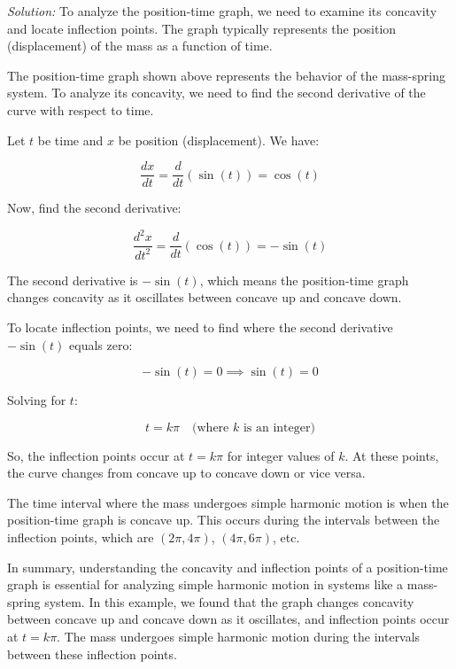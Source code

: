 \documentclass[a4paper,12pt]{book}
\newenvironment{solution}[1][]
{\par\noindent\textit{Solution:} \rmfamily}{\medskip}
\newcounter{example}
\begin{document}
\begin{solution}
To analyze the position-time graph, we need to examine its concavity and locate inflection points. The graph typically represents the position (displacement) of the mass as a function of time.

\begin{center}
\end{center}

The position-time graph shown above represents the behavior of the mass-spring system. To analyze its concavity, we need to find the second derivative of the curve with respect to time.

Let \(t\) be time and \(x\) be position (displacement). We have:

\[
\frac{dx}{dt} = \frac{d}{dt}(\sin(t)) = \cos(t)
\]

Now, find the second derivative:

\[
\frac{d^2x}{dt^2} = \frac{d}{dt}(\cos(t)) = -\sin(t)
\]

The second derivative is \(-\sin(t)\), which means the position-time graph changes concavity as it oscillates between concave up and concave down.

To locate inflection points, we need to find where the second derivative \(-\sin(t)\) equals zero:

\[
-\sin(t) = 0 \implies \sin(t) = 0
\]

Solving for \(t\):

\[
t = k\pi \quad \text{(where \(k\) is an integer)}
\]

So, the inflection points occur at \(t = k\pi\) for integer values of \(k\). At these points, the curve changes from concave up to concave down or vice versa.

The time interval where the mass undergoes simple harmonic motion is when the position-time graph is concave up. This occurs during the intervals between the inflection points, which are \((2\pi, 4\pi)\), \((4\pi, 6\pi)\), etc.

In summary, understanding the concavity and inflection points of a position-time graph is essential for analyzing simple harmonic motion in systems like a mass-spring system. In this example, we found that the graph changes concavity between concave up and concave down as it oscillates, and inflection points occur at \(t = k\pi\). The mass undergoes simple harmonic motion during the intervals between these inflection points.
\end{solution}
\end{document}
